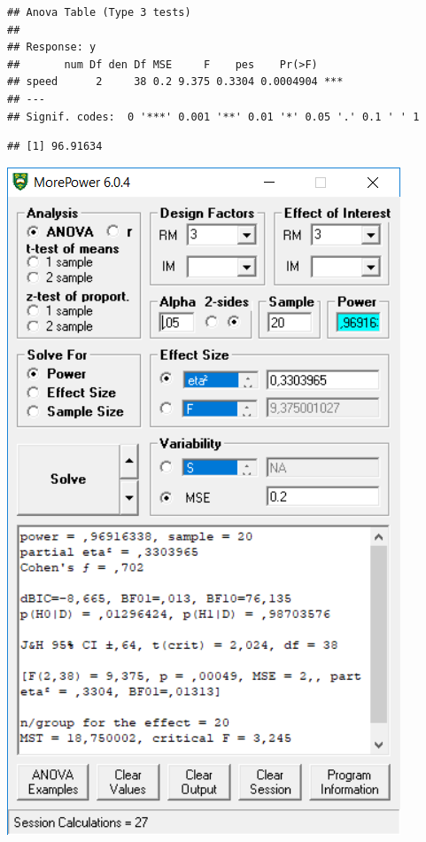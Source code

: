 \documentclass[
]{book}
\newenvironment{Shaded}{\begin{snugshade}}{\end{snugshade}}
\newcommand{\CommentTok}[1]{\textcolor[rgb]{0.56,0.35,0.01}{\textit{#1}}}
\newcommand{\NormalTok}[1]{#1}
\newcommand{\OperatorTok}[1]{\textcolor[rgb]{0.81,0.36,0.00}{\textbf{#1}}}
\begin{document}
\begin{verbatim}
## Anova Table (Type 3 tests)
## 
## Response: y
##       num Df den Df MSE     F    pes    Pr(>F)    
## speed      2     38 0.2 9.375 0.3304 0.0004904 ***
## ---
## Signif. codes:  0 '***' 0.001 '**' 0.01 '*' 0.05 '.' 0.1 ' ' 1
\end{verbatim}

\begin{Shaded}
\end{Shaded}

\begin{verbatim}
## [1] 96.91634
\end{verbatim}

\includegraphics{screenshots/morepower_3.png}
\end{document}
